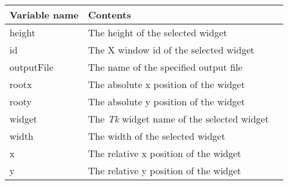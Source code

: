 {\newpage
\clearpage
\samepage \begin{figure}[hbt]
  \centerline{
  \epsfysize=9.5cm
  }

  \label{fig:The xfappdef program}
\end{figure}
}

{\newpage
\clearpage
\samepage \begin{figure}[hbt]
  \centerline{
  \epsfysize=8.5cm
  }

  \label{fig:The xfhardcopy program}
\end{figure}
}

{\newpage
\clearpage
\samepage \begin{tabular}{|l|l|p{8.5cm}|} \hline
Variable name & Contents\\  \hline
height        & The height of the selected widget\\  \hline
id            & The X window id of the selected widget\\  \hline
outputFile    & The name of the specified output file\\  \hline
rootx         & The absolute x position of the widget\\  \hline
rooty         & The absolute y position of the widget\\  \hline
widget        & The {\em Tk }
 widget name of the selected widget\\  \hline
width         & The width of the selected widget\\  \hline
x             & The relative x position of the widget\\  \hline
y             & The relative y position of the widget\\  \hline
\end{tabular}
}

{\newpage
\clearpage
\samepage \begin{figure}[hbt]
  \centerline{
  \epsfysize=12cm
  }

  \label{fig:The xfhelp program}
\end{figure}
}

{\newpage
\clearpage
\samepage \begin{figure}[hbt]
  \centerline{
  \epsfysize=12.5cm
  }

  \label{fig:The xfpixmap program}
\end{figure}
}

